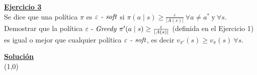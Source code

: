 \indent\underline{\textbf{Ejercicio 3}}\\
Se dice que una política $\pi$ es $\varepsilon \text{\textit{ - soft}}$ si $\pi(a \mid s) \geq \frac{\varepsilon}{|A(s)|} \ \forall a \neq a^{\ast} \ \text{y} \ \forall s$.
Demostrar que la política $\varepsilon \text{ - \textit{Greedy}} \ \pi'(a \mid s) \geq \frac{\varepsilon}{|A(s)|}$ (definida en el Ejercicio 1) es igual o mejor que cualquier política $\varepsilon \text{\textit{ - soft}}$, es decir $v_{\pi'}(s)\geq v_{\pi}(s) \ \forall s$.

\indent\underline{\textbf{Solución}}\\

\line(1,0){\textwidth}
